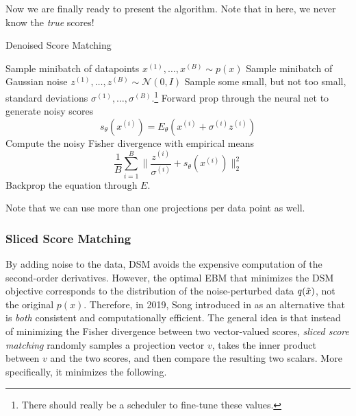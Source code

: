 \documentclass{article}
\begin{document}
    \begin{algo}
      Now we are finally ready to present the algorithm. Note that in here, we never know the \textit{true} scores! 
      \begin{algorithm}[H]
      \caption{Denoised Score Matching}
      \label{alg:denoised_score_matching}
      \begin{algorithmic}[1]  

          \State Sample minibatch of datapoints $x^{(1)}, \ldots, x^{(B)} \sim p(x)$ 
          \State Sample minibatch of Gaussian noise $z^{(1)}, \ldots, z^{(B)} \sim \mathcal{N}(0, I)$ 
          \State Sample some small, but not too small, standard deviations $\sigma^{(1)}, \ldots, \sigma^{(B)}$.\footnote{There should really be a scheduler to fine-tune these values. }
          \State Forward prop through the neural net to generate noisy scores 
          \begin{equation}
            s_\theta (x^{(i)}) = E_\theta(x^{(i)} + \sigma^{(i)} z^{(i)})
          \end{equation}
          \State Compute the noisy Fisher divergence with empirical means 
          \begin{equation}
            \frac{1}{B} \sum_{i=1}^B \bigg\| \frac{z^{(i)}}{\sigma^{(i)}} + s_\theta (x^{(i)}) \bigg\|_2^2
          \end{equation} 
          \State Backprop the equation through $E$. 
        \EndWhile
      \end{algorithmic}
      \end{algorithm}
      Note that we can use more than one projections per data point as well. 
    \end{algo}

  \subsubsection{Sliced Score Matching}

    By adding noise to the data, DSM avoids the expensive computation of the second-order derivatives. However, the optimal EBM that minimizes the DSM objective corresponds to the distribution of the noise-perturbed data $q(\Tilde{x})$, not the original $p(x)$. Therefore, in 2019, Song introduced in \cite{sliced_score} as an alternative that is \textit{both} consistent and computationally efficient. The general idea is that instead of minimizing the Fisher divergence between two vector-valued scores, \textit{sliced score matching} randomly samples a projection vector $v$, takes the inner product between $v$ and the two scores, and then compare the resulting two scalars. More specifically, it minimizes the following. 
\end{document}
